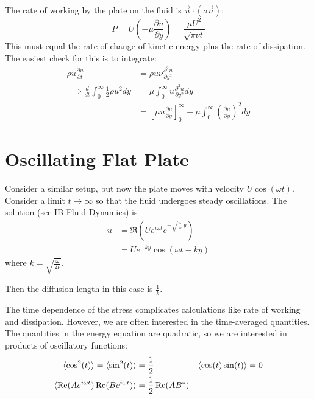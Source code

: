 \documentclass[../Main.tex]{subfiles}
\begin{document}
The rate of working by the plate on the fluid is $\vec{u} \cdot (\sigma \vec{n})$:
\begin{equation*}
    P = U\left(-\mu \frac{\partial u}{\partial y}\right) = \frac{\mu U^2}{\sqrt{\pi \nu t}}
\end{equation*}
This must equal the rate of change of kinetic energy plus the rate of dissipation. The easiest check for this is to integrate:
\begin{align*}
    \rho u \frac{\partial u}{\partial t} &= \rho u \nu \frac{\partial^{2}u}{\partial y^{2}} \\
    \implies \frac{d}{dt} \int_{0}^{\infty} \frac12 \rho u^2 dy &= \mu \int_{0}^{\infty} u \frac{\partial^{2}u}{\partial y^{2}} dy \\
    &= \left[\mu u \frac{\partial u}{\partial y}\right]_0^\infty - \mu \int_{0}^{\infty} \left(\frac{\partial u}{\partial y}\right)^2 dy 
\end{align*}
\section{Oscillating Flat Plate}
Consider a similar setup, but now the plate moves with velocity $U\cos(\omega t)$. Consider a limit $t \to \infty$ so that the fluid undergoes steady oscillations. The solution (see IB Fluid Dynamics) is
\begin{align*}
    u &= \Re\left(U e^{i\omega t} e^{-\sqrt{\frac{i\omega}{\nu}}y}\right) \\
    &= Ue^{-ky} \cos(\omega t - k y)
\end{align*}
where $k = \sqrt{\frac{\omega}{2\nu}}$.

Then the diffusion length in this case is $\frac1k$.

The time dependence of the stress complicates calculations like rate of working and dissipation. However, we are often interested in the time-averaged quantities. The quantities in the energy equation are quadratic, so we are interested in products of oscillatory functions:
\begin{align*}
    \langle\cos^2(t)\rangle = \langle\sin^2(t)\rangle &= \frac12 & \langle\cos(t)\sin(t)\rangle &= 0 \\
    \langle\operatorname{Re}(Ae^{i\omega t})\operatorname{Re}(Be^{i\omega t})\rangle &= \frac12 \operatorname{Re}(AB^*)
\end{align*}
\end{document}

